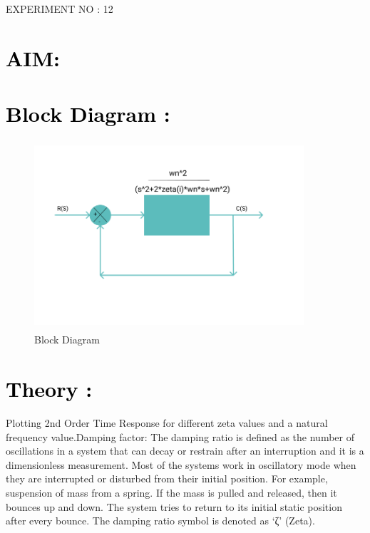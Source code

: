\documentclass[12pt]{article}
\begin{document}
\pagebreak

\begin{center}
    \LARGE {EXPERIMENT NO : 12}
             
\end{center}

\section*{\textcolor{black}{AIM:}}

\section*{\textcolor{black}{Block Diagram :}}

\begin{figure}[!hth]
        \centering
        \includegraphics[width =10cm, height = 7cm]{images/damping factor.png}
        \caption{Block Diagram}
        \label{Graph}
\end{figure}

\section*{\textcolor{black}{Theory :}}
Plotting 2nd Order Time Response for different zeta values and a natural frequency value.Damping factor:
The damping ratio is defined as the number of oscillations in a system that can decay or restrain after an interruption and it is a dimensionless measurement. Most of the systems work in oscillatory mode when they are interrupted or disturbed from their initial position. For example, suspension of mass from a spring. If the mass is pulled and released, then it bounces up and down. The system tries to return to its initial static position after every bounce.
The damping ratio symbol is denoted as ‘ζ’ (Zeta).\par
\end{document}
